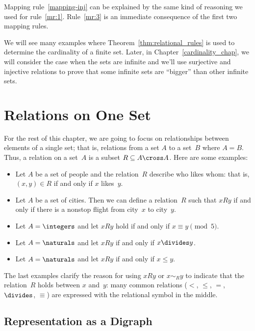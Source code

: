 Mapping rule~\ref{mapping-inj} can be explained by the same kind of reasoning
we used for rule~\ref{mr:1}.  Rule~\ref{mr:3} is an immediate
consequence of the first two mapping rules.

We will see many examples where Theorem~\ref{thm:relational_rules} is
used to determine the cardinality of a finite set.  Later, in
Chapter~\ref{cardinality_chap}, we will consider the case when the
sets are infinite and we'll use surjective and injective relations to
prove that some infinite sets are ``bigger'' than other infinite sets.

\section{Relations on One Set}

For the rest of this chapter, we are going to focus on relationships
between elements of a single set; that is, relations from a set $A$ to
a set~$B$ where $A = B$.  Thus, a relation on a set~$A$ is a subset $R
\subseteq A \cross A$.  Here are some examples:
\begin{itemize}

\item
Let $A$ be a set of people and the relation~$R$ describe who likes
whom: that is, $(x, y) \in R$ if and only if $x$ likes~$y$.

\item
Let $A$ be a set of cities.  Then we can define a relation~$R$ such
that $x R y$ if and only if there is a nonstop flight from city~$x$ to
city~$y$.

\item
Let $A = \integers$ and let $x R y$ hold if and only if $x \equiv y
\pmod{5}$.

\item
Let $A = \naturals$ and let $x R y$ if and only if $x \divides y$.

\item
Let $A = \naturals$ and let $x R y$ if and only if $x \le y$.

\end{itemize}
The last examples clarify the reason for using $x R y$ or $x \sim_R y$
to indicate that the relation~$R$ holds between $x$ and~$y$: many
common relations ($<$, $\le$, $=$, $\divides$, $\equiv$) are expressed
with the relational symbol in the middle.

\subsection{Representation as a Digraph}


